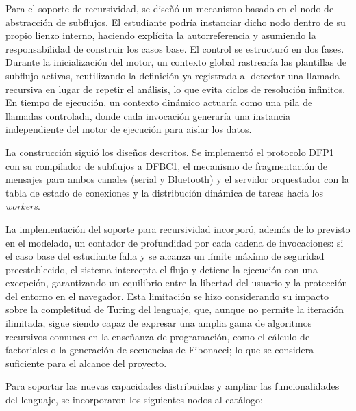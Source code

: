 Para el soporte de recursividad, se diseñó un mecanismo basado en el nodo de abstracción de subflujos. El estudiante podría instanciar dicho nodo dentro de su propio lienzo interno, haciendo explícita la autorreferencia y asumiendo la responsabilidad de construir los casos base. El control se estructuró en dos fases. Durante la inicialización del motor, un contexto global rastrearía las plantillas de subflujo activas, reutilizando la definición ya registrada al detectar una llamada recursiva en lugar de repetir el análisis, lo que evita ciclos de resolución infinitos. En tiempo de ejecución, un contexto dinámico actuaría como una pila de llamadas controlada, donde cada invocación generaría una instancia independiente del motor de ejecución para aislar los datos.

La construcción siguió los diseños descritos. Se implementó el protocolo DFP1 con su compilador de subflujos a DFBC1, el mecanismo de fragmentación de mensajes para ambos canales (serial y Bluetooth) y el servidor orquestador con la tabla de estado de conexiones y la distribución dinámica de tareas hacia los \emph{workers}.

La implementación del soporte para recursividad incorporó, además de lo previsto en el modelado, un contador de profundidad por cada cadena de invocaciones: si el caso base del estudiante falla y se alcanza un límite máximo de seguridad preestablecido, el sistema intercepta el flujo y detiene la ejecución con una excepción, garantizando un equilibrio entre la libertad del usuario y la protección del entorno en el navegador. Esta limitación se hizo considerando su impacto sobre la completitud de Turing del lenguaje, que, aunque no permite la iteración ilimitada, sigue siendo capaz de expresar una amplia gama de algoritmos recursivos comunes en la enseñanza de programación, como el cálculo de factoriales o la generación de secuencias de Fibonacci; lo que se considera suficiente para el alcance del proyecto.

Para soportar las nuevas capacidades distribuidas y ampliar las funcionalidades del lenguaje, se incorporaron los siguientes nodos al catálogo:

